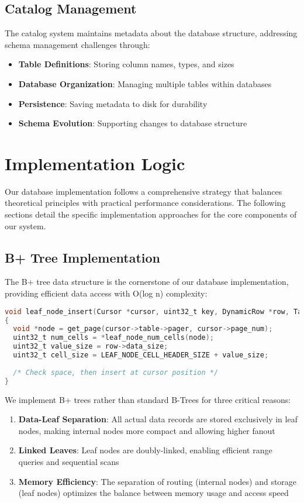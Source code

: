 \documentclass[12pt,a4paper]{article}  %
\begin{document}
\subsection{Catalog Management}
The catalog system maintains metadata about the database structure, addressing schema management challenges through:

\begin{itemize}
    \item \textbf{Table Definitions}: Storing column names, types, and sizes
    \item \textbf{Database Organization}: Managing multiple tables within databases
    \item \textbf{Persistence}: Saving metadata to disk for durability
    \item \textbf{Schema Evolution}: Supporting changes to database structure
\end{itemize}

\section{Implementation Logic}

Our database implementation follows a comprehensive strategy that balances theoretical principles with practical performance considerations. The following sections detail the specific implementation approaches for the core components of our system.

\subsection{B+ Tree Implementation}

The B+ tree data structure is the cornerstone of our database implementation, providing efficient data access with O(log n) complexity:

\begin{lstlisting}[language=C]
void leaf_node_insert(Cursor *cursor, uint32_t key, DynamicRow *row, TableDef *table_def)
{
  void *node = get_page(cursor->table->pager, cursor->page_num);
  uint32_t num_cells = *leaf_node_num_cells(node);
  uint32_t value_size = row->data_size;
  uint32_t cell_size = LEAF_NODE_CELL_HEADER_SIZE + value_size;
  
  /* Check space, then insert at cursor position */
}
\end{lstlisting}

We implement B+ trees rather than standard B-Trees for three critical reasons:
\begin{enumerate}
    \item \textbf{Data-Leaf Separation}: All actual data records are stored exclusively in leaf nodes, making internal nodes more compact and allowing higher fanout
    \item \textbf{Linked Leaves}: Leaf nodes are doubly-linked, enabling efficient range queries and sequential scans
    \item \textbf{Memory Efficiency}: The separation of routing (internal nodes) and storage (leaf nodes) optimizes the balance between memory usage and access speed
\end{enumerate}
\end{document}
